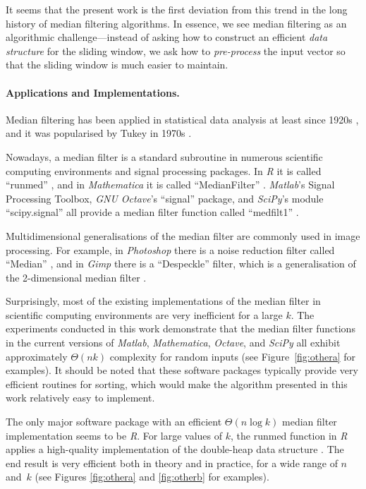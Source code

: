 \documentclass[a4paper,11pt]{article}
\newcommand{\rmfcite}{\citesoftware[p.~1507]{r-manual}}
\begin{document}
It seems that the present work is the first deviation from this trend in the long history of median filtering algorithms. In essence, we see median filtering as an algorithmic challenge---instead of asking how to construct an efficient \emph{data structure} for the sliding window, we ask how to \emph{pre-process} the input vector so that the sliding window is much easier to maintain.

\paragraph{Applications and Implementations.}

Median filtering has been applied in statistical data analysis at least since 1920s \cite{king24seasonal}, and it was popularised by Tukey in 1970s \cite[Section 7A]{tukey77eda}.

Nowadays, a median filter is a standard subroutine in numerous scientific computing environments and signal processing packages. In \emph{R} it is called ``runmed'' \rmfcite{}, and in \emph{Mathematica} it is called ``MedianFilter'' . \emph{Matlab}'s Signal Processing Toolbox, \emph{GNU Octave}'s ``signal'' package, and \emph{SciPy}'s module ``scipy.signal'' all provide a median filter function called ``medfilt1'' .

Multidimensional generalisations of the median filter are commonly used in image processing. For example, in \emph{Photoshop} there is a noise reduction filter called ``Median'' , and in \emph{Gimp} there is a ``Despeckle'' filter, which is a generalisation of the 2-dimensional median filter .

Surprisingly, most of the existing implementations of the median filter in scientific computing environments are very inefficient for a large $k$. The experiments conducted in this work demonstrate that the median filter functions in the current versions of \emph{Matlab}, \emph{Mathematica}, \emph{Octave}, and \emph{SciPy} all exhibit approximately $\Theta(n k)$ complexity for random inputs (see Figure~\ref{fig:othera} for examples). It should be noted that these software packages typically provide very efficient routines for sorting, which would make the algorithm presented in this work relatively easy to implement.

The only major software package with an efficient $\Theta(n \log k)$ median filter implementation seems to be \emph{R}\@. For large values of $k$, the runmed function in \emph{R} applies a high-quality implementation of the double-heap data structure \cite{astola89median,juhola91comparison,hardle95median-smooth}. The end result is very efficient both in theory and in practice, for a wide range of $n$ and~$k$ (see Figures \ref{fig:othera} and \ref{fig:otherb} for examples).
\end{document}
